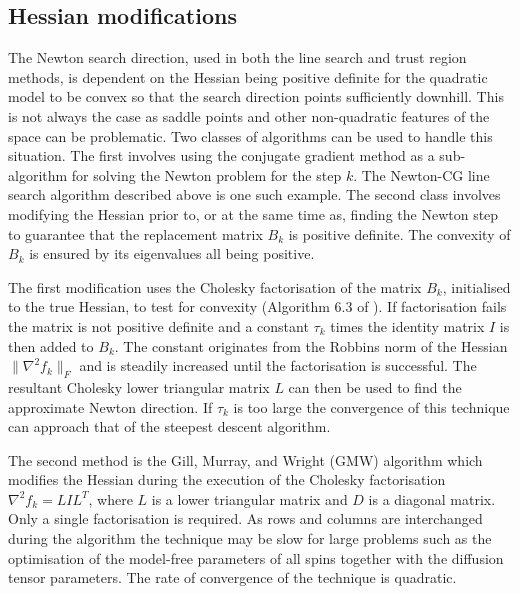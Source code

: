 
\subsection{Hessian modifications}

The Newton search direction, used in both the line search and trust region methods, is dependent on the Hessian being positive definite for the quadratic model to be convex so that the search direction points sufficiently downhill.  This is not always the case as saddle points and other non-quadratic features of the space can be problematic.  Two classes of algorithms can be used to handle this situation.  The first involves using the conjugate gradient method as a sub-algorithm for solving the Newton problem for the step $k$.  The Newton-CG line search algorithm described above is one such example.  The second class involves modifying the Hessian prior to, or at the same time as, finding the Newton step to guarantee that the replacement matrix $B_k$ is positive definite.  The convexity of $B_k$ is ensured by its eigenvalues all being positive.

The first modification uses the Cholesky factorisation of the matrix $B_k$, initialised to the true Hessian, to test for convexity (Algorithm 6.3 of \citet{NocedalWright99}).  If factorisation fails the matrix is not positive definite and a constant $\tau_k$ times the identity matrix $I$ is then added to $B_k$.  The constant originates from the Robbins norm of the Hessian $\lVert \nabla^2 f_k \rVert_F$ and is steadily increased until the factorisation is successful.  The resultant Cholesky lower triangular matrix $L$ can then be used to find the approximate Newton direction.  If $\tau_k$ is too large the convergence of this technique can approach that of the steepest descent algorithm.

The second method is the Gill, Murray, and Wright (GMW) algorithm \citep{GMW81} which modifies the Hessian during the execution of the Cholesky factorisation $\nabla^2 f_k = LIL^T$, where $L$ is a lower triangular matrix and $D$ is a diagonal matrix.  Only a single factorisation is required.  As rows and columns are interchanged during the algorithm the technique may be slow for large problems such as the optimisation of the model-free parameters of all spins together with the diffusion tensor parameters.  The rate of convergence of the technique is quadratic.



